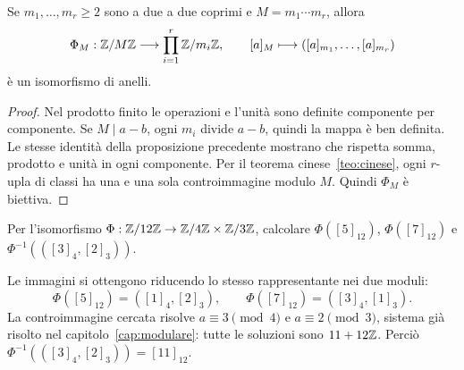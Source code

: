 \begin{corollario}\label{cor:crt-anelli}
Se $m_1,\ldots,m_r\ge2$ sono a due a due coprimi e $M=m_1\cdots m_r$, allora
\[
\Phi_M:\mathbb{Z}/M\mathbb{Z}\longrightarrow\prod_{i=1}^r\mathbb{Z}/m_i\mathbb{Z},
\qquad [a]_M\longmapsto([a]_{m_1},\ldots,[a]_{m_r})
\]
è un isomorfismo di anelli.
\end{corollario}
\begin{proof}
Nel prodotto finito le operazioni e l'unità sono definite componente per componente. Se $M\mid a-b$, ogni $m_i$ divide $a-b$, quindi la mappa è ben definita. Le stesse identità della proposizione precedente mostrano che rispetta somma, prodotto e unità in ogni componente. Per il teorema cinese~\ref{teo:cinese}, ogni $r$-upla di classi ha una e una sola controimmagine modulo $M$. Quindi $\Phi_M$ è biettiva.
\end{proof}

\begin{esercizio}
Per l'isomorfismo $\Phi:\mathbb{Z}/12\mathbb{Z}\to\mathbb{Z}/4\mathbb{Z}\times\mathbb{Z}/3\mathbb{Z}$, calcolare $\Phi([5]_{12})$, $\Phi([7]_{12})$ e $\Phi^{-1}(([3]_4,[2]_3))$.
\end{esercizio}
\begin{svolgimento}
Le immagini si ottengono riducendo lo stesso rappresentante nei due moduli:
\[
\Phi([5]_{12})=([1]_4,[2]_3),\qquad
\Phi([7]_{12})=([3]_4,[1]_3).
\]
La controimmagine cercata risolve $a\equiv3\pmod4$ e $a\equiv2\pmod3$, sistema già risolto nel capitolo~\ref{cap:modulare}: tutte le soluzioni sono $11+12\mathbb{Z}$. Perciò $\Phi^{-1}(([3]_4,[2]_3))=[11]_{12}$.
\end{svolgimento}

